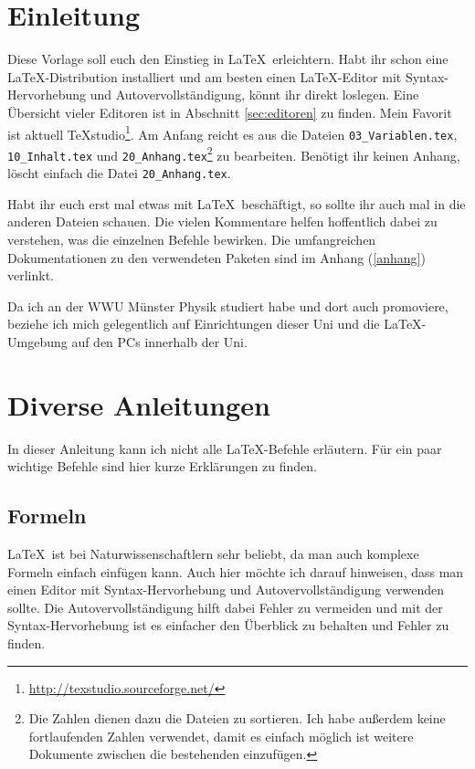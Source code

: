 \chapter{Einleitung}

Diese Vorlage soll euch den Einstieg in \LaTeX\ erleichtern. Habt ihr schon eine \LaTeX-Distribution installiert und am besten einen \LaTeX-Editor mit Syntax-Hervorhebung und Autovervollständigung, könnt ihr direkt loslegen. Eine Übersicht vieler Editoren ist in Abschnitt \ref{sec:editoren} zu finden. Mein Favorit ist aktuell TeXstudio\footnote{\url{http://texstudio.sourceforge.net/}}. Am Anfang reicht es aus die Dateien \verb|03_Variablen.tex|, \verb|10_Inhalt.tex| und \verb|20_Anhang.tex|\footnote{Die Zahlen dienen dazu die Dateien zu sortieren. Ich habe außerdem keine fortlaufenden Zahlen verwendet, damit es einfach möglich ist weitere Dokumente zwischen die bestehenden einzufügen.} zu bearbeiten. Benötigt ihr keinen Anhang, löscht einfach die Datei \verb|20_Anhang.tex|.

Habt ihr euch erst mal etwas mit \LaTeX\ beschäftigt, so sollte ihr auch mal in die anderen Dateien schauen. Die vielen Kommentare helfen hoffentlich dabei zu verstehen, was die einzelnen Befehle bewirken. Die umfangreichen Dokumentationen zu den verwendeten Paketen sind im Anhang (\ref{anhang}) verlinkt.

Da ich an der WWU Münster Physik studiert habe und dort auch promoviere, beziehe ich mich gelegentlich auf Einrichtungen dieser Uni und die \LaTeX-Umgebung auf den PCs innerhalb der Uni.

\newpage
\chapter{Diverse Anleitungen}

In dieser Anleitung kann ich nicht alle \LaTeX-Befehle erläutern. Für ein paar wichtige Befehle sind hier kurze Erklärungen zu finden.

\section{Formeln}

\LaTeX\ ist bei Naturwissenschaftlern sehr beliebt, da man auch komplexe Formeln einfach einfügen kann. Auch hier möchte ich darauf hinweisen, dass man einen Editor mit Syntax-Hervorhebung und Autovervollständigung verwenden sollte. Die Autovervollständigung hilft dabei Fehler zu vermeiden und mit der Syntax-Hervorhebung ist es einfacher den Überblick zu behalten und Fehler zu finden.

